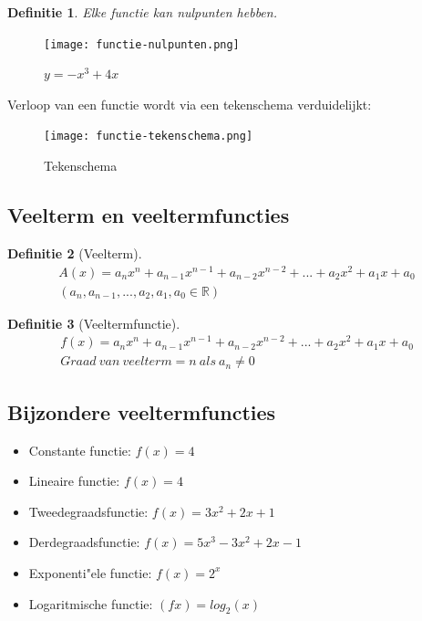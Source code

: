 \documentclass{article}
\newtheorem{theorem}{Definitie}[section]
\begin{document}
\begin{theorem}
    Elke functie kan nulpunten hebben.
\end{theorem}

\begin{figure}[H]
    \centering
    \texttt{[image: functie-nulpunten.png]}
    \caption{$y=-x^3 + 4x$}
\end{figure}

Verloop van een functie wordt via een tekenschema verduidelijkt:

\begin{figure}[H]
    \centering
    \texttt{[image: functie-tekenschema.png]}
    \caption{Tekenschema}
\end{figure}

\subsection{Veelterm en veeltermfuncties}

\begin{theorem}[Veelterm]
\begin{equation}
    \begin{aligned}
        A(x) = a_nx^n + a_{n-1}x^{n-1} + a_{n-2}x^{n-2} + ... + a_{2}x^{2} + a_1x + a_0\\
        (a_n,a_{n-1},...,a_2,a_1,a_0 \in \mathbb{R})
    \end{aligned}
\end{equation}

\end{theorem}

\begin{theorem}[Veeltermfunctie]
\begin{equation}
    \begin{aligned}
        f(x) = a_nx^n + a_{n-1}x^{n-1} + a_{n-2}x^{n-2} + ... + a_{2}x^{2} + a_1x + a_0\\
        Graad\ van\ veelterm = n\ als\ a_n \neq 0
    \end{aligned}
\end{equation}
\end{theorem}

\subsection{Bijzondere veeltermfuncties}

\begin{itemize}
    \item Constante functie: $f(x) = 4$
    \item Lineaire functie: $f(x) = 4$
    \item Tweedegraadsfunctie: $f(x) = 3x^2 + 2x + 1$
    \item Derdegraadsfunctie: $f(x) = 5x^3 - 3x^2 + 2x - 1$
    \item Exponenti"ele functie: $f(x) = 2^x$
    \item Logaritmische functie: $(fx) = log_2(x)$
\end{itemize}
\end{document}
